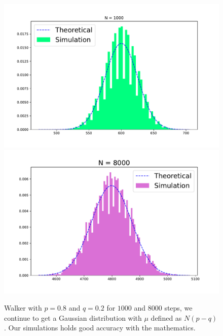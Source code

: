 \documentclass[showpacs,amsmath,amssymb,aps,pre,twocolumn]{revtex4-1}
\begin{document}
\begin{figure}[H]
    \centering
    \includegraphics[scale= 0.35]{N_1000_biashed.pdf}
    \includegraphics[scale = 0.40]{N_8000_biashed.pdf}
    \caption{Walker with $p = 0.8$ and $q = 0.2$ for $1000$ and $8000$ steps, we continue to get a Gaussian distribution with $\mu$ defined as $N(p-q)$. Our simulations holds good accuracy with the mathematics.}
    \label{fig:my_label}
\end{figure}




\end{document}
